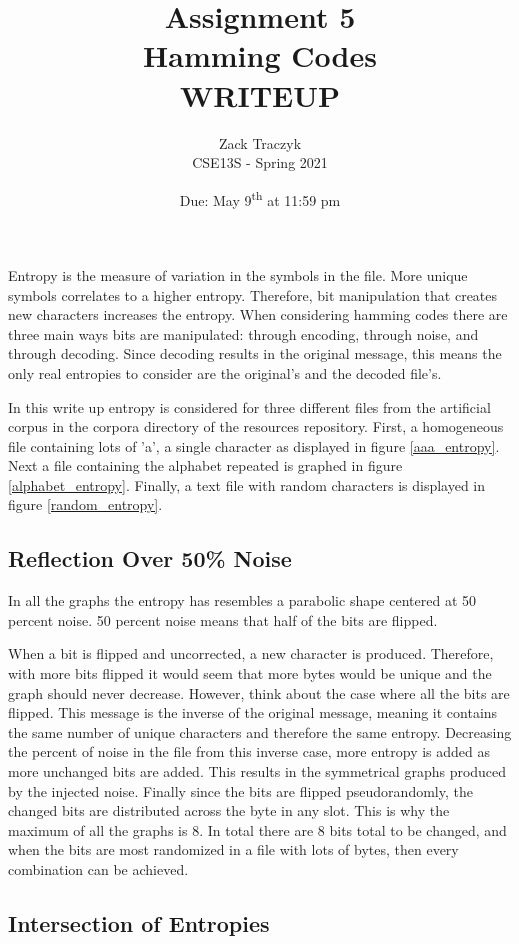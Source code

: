 \documentclass[12pt]{article}
\title{%
    \textbf{Assignment 5 \\ 
        Hamming Codes \\
\large WRITEUP} }
\author{Zack Traczyk \\ CSE13S - Spring 2021}
\date{Due: May 9\textsuperscript{th} at 11:59 pm}
\begin{document}
\maketitle

Entropy is the measure of variation in the symbols in the file. More unique symbols
correlates to a higher entropy. Therefore, bit manipulation that creates new characters
increases the entropy. When considering hamming codes there are three main ways bits are
manipulated: through encoding, through noise, and through decoding. Since decoding results
in the original message, this means the only real entropies to consider are the original's and
the decoded file's.

In this write up entropy is considered for three different files from the artificial corpus
in the corpora directory of the resources repository. First, a homogeneous file
containing lots of 'a', a single character as displayed in figure \ref{aaa_entropy}.
Next a file containing the alphabet repeated is graphed in figure \ref{alphabet_entropy}.
Finally, a text file with random characters is displayed in figure \ref{random_entropy}.

\subsection{Reflection Over 50\% Noise}

In all the graphs the entropy has resembles a parabolic shape centered at 50 percent noise. 
50 percent noise means that half of the bits are flipped.

When a bit is flipped and uncorrected, a new character is produced.
Therefore, with more bits flipped it would seem that more bytes would be unique and
the graph should never decrease.
However, think about the case where all the bits are flipped.
This message is the inverse of the original message, meaning it contains the same
number of unique characters and therefore the same entropy. 
Decreasing the percent of noise in the file from this inverse case, more entropy is
added as more unchanged bits are added. This results in the symmetrical graphs produced
by the injected noise.
Finally since the bits are flipped pseudorandomly, the changed bits are distributed across the byte in any slot.
This is why the maximum of all the graphs is 8.
In total there are 8 bits total to be changed, and when the bits are most
randomized in a file with lots of bytes, then every combination can be achieved.

\subsection{Intersection of Entropies}
\end{document}
